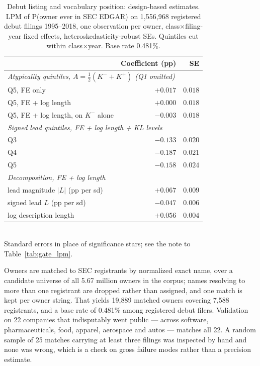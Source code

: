 \begin{table}[h]\centering\small
\caption{Debut listing and vocabulary position: design-based estimates.
LPM of P(owner ever in SEC EDGAR) on 1{,}556{,}968 registered debut
filings 1995--2018, one observation per owner, class$\times$filing-year
fixed effects, heteroskedasticity-robust SEs. Quintiles cut within
class$\times$year. Base rate 0.481\%.}
\label{tab:edgar}
\begin{tabular}{lrr}
\toprule
 & Coefficient (pp) & SE \\
\midrule
\multicolumn{3}{l}{\emph{Atypicality quintiles, $A = \tfrac{1}{2}(K^{-}+K^{+})$ (Q1 omitted)}} \\
\quad Q5, FE only & $+0.017$ & $0.018$ \\
\quad Q5, FE + log length & $+0.000$ & $0.018$ \\
\quad Q5, FE + log length, on $K^{-}$ alone & $-0.003$ & $0.018$ \\
\midrule
\multicolumn{3}{l}{\emph{Signed lead quintiles, FE + log length + KL levels}} \\
\quad Q3 & $-0.133$ & $0.020$ \\
\quad Q4 & $-0.187$ & $0.021$ \\
\quad Q5 & $-0.158$ & $0.024$ \\
\midrule
\multicolumn{3}{l}{\emph{Decomposition, FE + log length}} \\
\quad lead magnitude $|L|$ (pp per sd) & $+0.067$ & $0.009$ \\
\quad signed lead $L$ (pp per sd) & $-0.047$ & $0.006$ \\
\quad log description length & $+0.056$ & $0.004$ \\
\bottomrule
\end{tabular}
\\[0.3em]\footnotesize Standard errors in place of significance stars; see
the note to Table~\ref{tab:gate_lpm}.
\end{table}

Owners are matched to SEC registrants by normalized exact name, over a
candidate universe of all 5.67 million owners in the corpus; names
resolving to more than one registrant are dropped rather than assigned,
and one match is kept per owner string. That yields 19{,}889 matched
owners covering 7{,}588 registrants, and a base rate of 0.481\% among
registered debut filers. Validation on 22 companies that indisputably went
public --- across software, pharmaceuticals, food, apparel, aerospace and
autos --- matches all 22. A random sample of 25 matches carrying at least
three filings was inspected by hand and none was wrong, which is a check
on gross failure modes rather than a precision estimate.


